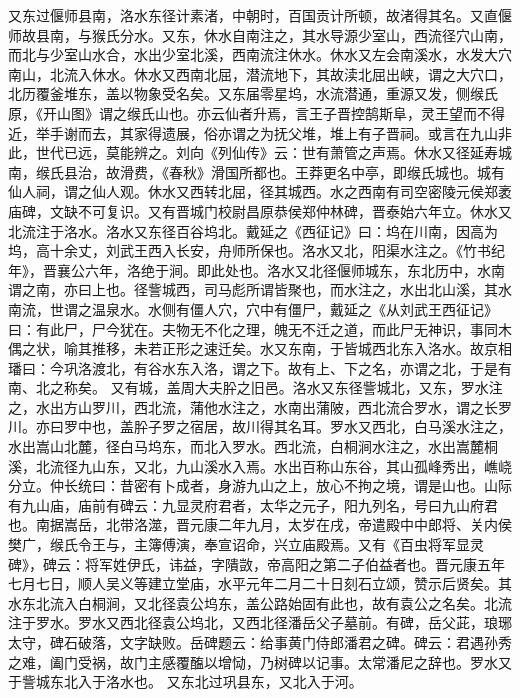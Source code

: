 \documentclass[12pt,UTF8]{ctexbook}
\begin{document}
又东过偃师县南，洛水东径计素渚，中朝时，百国贡计所顿，故渚得其名。又直偃师故县南，与猴氏分水。又东，休水自南注之，其水导源少室山，西流径穴山南，而北与少室山水合，水出少室北溪，西南流注休水。休水又左会南溪水，水发大穴南山，北流入休水。休水又西南北屈，潜流地下，其故渎北屈出峡，谓之大穴口，北历覆釜堆东，盖以物象受名矣。又东届零星坞，水流潜通，重源又发，侧缑氏原，《开山图》谓之缑氏山也。亦云仙者升焉，言王子晋控鹄斯阜，灵王望而不得近，举手谢而去，其家得遗展，俗亦谓之为抚父堆，堆上有子晋祠。或言在九山非此，世代已远，莫能辨之。刘向《列仙传》云：世有萧管之声焉。休水又径延寿城南，缑氏县治，故滑费，《春秋》滑国所都也。王莽更名中亭，即缑氏城也。城有仙人祠，谓之仙人观。休水又西转北屈，径其城西。水之西南有司空密陵元侯郑袤庙碑，文缺不可复识。又有晋城门校尉昌原恭侯郑仲林碑，晋泰始六年立。休水又北流注于洛水。洛水又东径百谷坞北。戴延之《西征记》曰：坞在川南，因高为坞，高十余丈，刘武王西入长安，舟师所保也。洛水又北，阳渠水注之。《竹书纪年》，晋襄公六年，洛绝于涧。即此处也。洛水又北径偃师城东，东北历中，水南谓之南，亦曰上也。径訾城西，司马彪所谓皆聚也，而水注之，水出北山溪，其水南流，世谓之温泉水。水侧有僵人穴，穴中有僵尸，戴延之《从刘武王西征记》曰：有此尸，尸今犹在。夫物无不化之理，魄无不迁之道，而此尸无神识，事同木偶之状，喻其推移，未若正形之速迁矣。水又东南，于皆城西北东入洛水。故京相璠曰：今巩洛渡北，有谷水东入洛，谓之下。故有上、下之名，亦谓之北，于是有南、北之称矣。
又有城，盖周大夫肸之旧邑。洛水又东径訾城北，又东，罗水注之，水出方山罗川，西北流，蒲他水注之，水南出蒲陂，西北流合罗水，谓之长罗川。亦曰罗中也，盖肸子罗之宿居，故川得其名耳。罗水又西北，白马溪水注之，水出嵩山北麓，径白马坞东，而北入罗水。西北流，白桐涧水注之，水出嵩麓桐溪，北流径九山东，又北，九山溪水入焉。水出百称山东谷，其山孤峰秀出，嶕峣分立。仲长统曰：昔密有卜成者，身游九山之上，放心不拘之境，谓是山也。山际有九山庙，庙前有碑云：九显灵府君者，太华之元子，阳九列名，号曰九山府君也。南据嵩岳，北带洛澨，晋元康二年九月，太岁在戌，帝遣殿中中郎将、关内侯樊广，缑氏令王与，主簿傅演，奉宣诏命，兴立庙殿焉。又有《百虫将军显灵碑》，碑云：将军姓伊氏，讳益，字隤敳，帝高阳之第二子伯益者也。晋元康五年七月七日，顺人吴义等建立堂庙，水平元年二月二十日刻石立颂，赞示后贤矣。其水东北流入白桐涧，又北径袁公坞东，盖公路始固有此也，故有袁公之名矣。北流注于罗水。罗水又西北径袁公坞北，又西北径潘岳父子墓前。有碑，岳父茈，琅琊太守，碑石破落，文字缺败。岳碑题云：给事黄门侍郎潘君之碑。碑云：君遇孙秀之难，阖门受祸，故门主感覆醢以增恸，乃树碑以记事。太常潘尼之辞也。罗水又于訾城东北入于洛水也。
又东北过巩县东，又北入于河。
\end{document}
